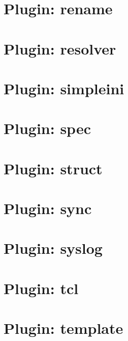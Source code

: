 \documentclass[twoside]{book}
\newcommand{\+}{\discretionary{\mbox{\scriptsize$\hookleftarrow$}}{}{}}
\begin{document}
\chapter{Plugin\+: rename}
\label{md_src_plugins_rename_README}
\hypertarget{md_src_plugins_rename_README}{}

\chapter{Plugin\+: resolver}
\label{md_src_plugins_resolver_README}
\hypertarget{md_src_plugins_resolver_README}{}

\chapter{Plugin\+: simpleini}
\label{md_src_plugins_simpleini_README}
\hypertarget{md_src_plugins_simpleini_README}{}

\chapter{Plugin\+: spec}
\label{md_src_plugins_spec_README}
\hypertarget{md_src_plugins_spec_README}{}

\chapter{Plugin\+: struct}
\label{md_src_plugins_struct_README}
\hypertarget{md_src_plugins_struct_README}{}

\chapter{Plugin\+: sync}
\label{md_src_plugins_sync_README}
\hypertarget{md_src_plugins_sync_README}{}

\chapter{Plugin\+: syslog}
\label{md_src_plugins_syslog_README}
\hypertarget{md_src_plugins_syslog_README}{}

\chapter{Plugin\+: tcl}
\label{md_src_plugins_tcl_README}
\hypertarget{md_src_plugins_tcl_README}{}

\chapter{Plugin\+: template}
\label{md_src_plugins_template_README}
\hypertarget{md_src_plugins_template_README}{}

\end{document}
